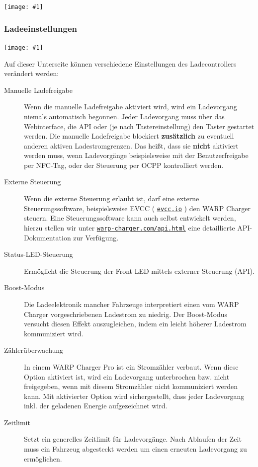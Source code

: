 \documentclass[a4paper,10pt]{article}
\newcommand{\gfx}[1]{\texttt{[image: \#1]}}
\newcommand\rurl[2]{%
  \href{#1}{\nolinkurl{#2}}%
}
\begin{document}
\begin{multicols*}{2}
	\gfx{./img_warp2/resized/web_evse2}

	\subsubsection{Ladeeinstellungen}\label{evse-settings}
	\gfx{./img_warp2/resized/web_evse2_settings}

	Auf dieser Unterseite können verschiedene Einstellungen des Ladecontrollers verändert werden:

	\begin{description}
	 \item[Manuelle Ladefreigabe] Wenn die manuelle Ladefreigabe aktiviert wird, wird ein Ladevorgang niemals automatisch begonnen. Jeder Ladevorgang muss über das Webinterface, die API oder (je nach Tastereinstellung) den Taster gestartet werden. Die manuelle Ladefreigabe blockiert \textbf{zusätzlich} zu eventuell anderen aktiven Ladestromgrenzen. Das heißt, dass sie \textbf{nicht} aktiviert werden muss, wenn Ladevorgänge beispielsweise mit der Benutzerfreigabe per NFC-Tag, oder der Steuerung per OCPP kontrolliert werden.
	 \item[Externe Steuerung] Wenn die externe Steuerung erlaubt ist, darf eine externe Steuerungssoftware, beispielsweise
	 EVCC (\rurl{https://evcc.io}{evcc.io}) den WARP Charger steuern. Eine Steuerungssoftware kann auch selbst entwickelt werden, hierzu stellen
	 wir unter \rurl{https://warp-charger.com/api.html}{warp-charger.com/api.html} eine detaillierte API-Dokumentation zur Verfügung.
	 \item[Status-LED-Steuerung] Ermöglicht die Steuerung der Front-LED mittels externer Steuerung (API).
	 \item[Boost-Modus] Die Ladeelektronik mancher Fahrzeuge interpretiert einen vom WARP Charger vorgeschriebenen Ladestrom zu niedrig. Der Boost-Modus versucht diesen Effekt auszugleichen, indem ein leicht höherer Ladestrom kommuniziert wird.
	 \item[Zählerüberwachung] In einem WARP Charger Pro ist ein Stromzähler verbaut. Wenn diese Option aktiviert ist, wird ein Ladevorgang unterbrochen bzw. nicht freigegeben, wenn mit diesem Stromzähler nicht kommuniziert werden kann. Mit aktivierter Option wird sichergestellt, dass jeder Ladevorgang inkl. der geladenen Energie aufgezeichnet wird.
	 \item[Zeitlimit] Setzt ein generelles Zeitlimit für Ladevorgänge. Nach Ablaufen der Zeit muss ein Fahrzeug abgesteckt werden um einen erneuten Ladevorgang zu ermöglichen.

\end{description}
\end{multicols*}
\end{document}
